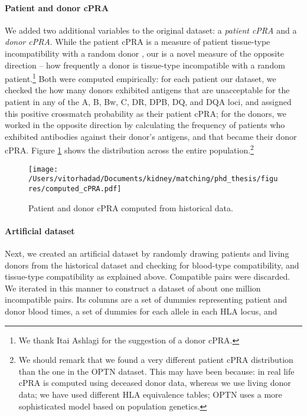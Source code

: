 \documentclass[format=acmsmall, review=false]{acmart}
\begin{document}
\paragraph{Patient and donor cPRA} We added two additional variables to the original dataset: a \emph{patient cPRA} and a \emph{donor cPRA}. While the patient cPRA is a measure of patient tissue-type incompatibility with a random donor \cite{cecka2010calculated}, our  is a novel measure of the opposite direction -- how frequently a donor is tissue-type incompatible with a random patient.\footnote{We thank Itai Ashlagi for the suggestion of a donor cPRA.} Both were computed empirically: for each patient our dataset, we checked the how many donors exhibited antigens that are unacceptable for the patient in any of the A, B, Bw, C, DR, DPB, DQ, and DQA loci, and assigned this positive crossmatch probability as their patient cPRA; for the donors, we worked in the opposite direction by calculating the frequency of patients who exhibited antibodies against their donor's antigens, and that became their donor cPRA. Figure \ref{fig:cpra} shows the distribution across the entire population.\footnote{We should remark that we found a very different patient cPRA distribution than the one in the OPTN dataset. This may have been because: in real life cPRA is computed using deceased donor data, whereas we use living donor data; we have used different HLA equivalence tables; OPTN uses a more sophisticated model based on population genetics.\cite{optn2013cpra}}


\begin{figure}
\centering
\texttt{[image: /Users/vitorhadad/Documents/kidney/matching/phd\_thesis/figures/computed\_cPRA.pdf]}
\caption{Patient and donor cPRA computed from historical data.}
\label{fig:cpra}
\end{figure}


\paragraph{Artificial dataset} Next, we created an artificial dataset by randomly drawing patients and living donors from the historical dataset and checking for blood-type compatibility, and tissue-type compatibility as explained above. Compatible pairs were discarded. We iterated in this manner to construct a dataset of about one million incompatible pairs. Its columns are a set of dummies representing patient and donor blood times, a set of dummies for each allele in each HLA locus, and 
\end{document}

